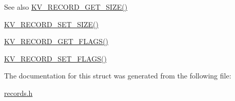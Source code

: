 \begin{DoxySeeAlso}{See also}
\mbox{\hyperlink{records_8h_a6c57183858046577704315da0c646e17}{K\+V\+\_\+\+R\+E\+C\+O\+R\+D\+\_\+\+G\+E\+T\+\_\+\+S\+I\+Z\+E()}} 

\mbox{\hyperlink{records_8h_a422fd63a07942a1af4d47c76b34857c9}{K\+V\+\_\+\+R\+E\+C\+O\+R\+D\+\_\+\+S\+E\+T\+\_\+\+S\+I\+Z\+E()}} 

\mbox{\hyperlink{records_8h_a9e4e6c1a697e44bdc2a2f12dbbae4aaf}{K\+V\+\_\+\+R\+E\+C\+O\+R\+D\+\_\+\+G\+E\+T\+\_\+\+F\+L\+A\+G\+S()}} 

\mbox{\hyperlink{records_8h_a5202e03977dd0331402ecccf11df1646}{K\+V\+\_\+\+R\+E\+C\+O\+R\+D\+\_\+\+S\+E\+T\+\_\+\+F\+L\+A\+G\+S()}} 
\end{DoxySeeAlso}


The documentation for this struct was generated from the following file\+:\begin{DoxyCompactItemize}
\item 
\mbox{\hyperlink{records_8h}{records.\+h}}\end{DoxyCompactItemize}
